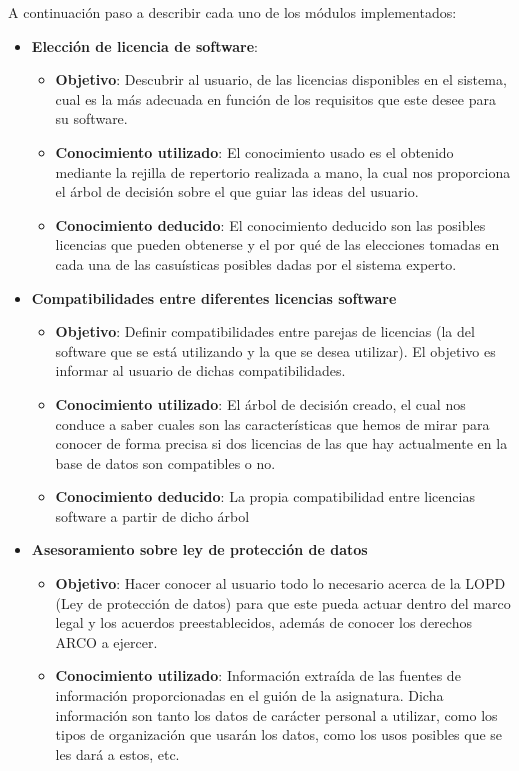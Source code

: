 A continuación paso a describir cada uno de los módulos implementados:
\begin{itemize}
	\item \textbf{Elección de licencia de software}:\\
		\begin{itemize}
			\item \textbf{Objetivo}: Descubrir al usuario, de las licencias disponibles en el sistema, cual es la más adecuada en función de los requisitos que este desee para su software.
			\item \textbf{Conocimiento utilizado}: El conocimiento usado es el obtenido mediante la rejilla de repertorio realizada a mano, la cual nos proporciona el árbol de decisión sobre el que guiar las ideas del usuario.
			\item \textbf{Conocimiento deducido}: El conocimiento deducido son las posibles licencias que pueden obtenerse y el por qué de las elecciones tomadas en cada una de las casuísticas posibles dadas por el sistema experto.
		\end{itemize}
	\item \textbf{Compatibilidades entre diferentes licencias software}\\
		\begin{itemize}
			\item \textbf{Objetivo}: Definir compatibilidades entre parejas de licencias (la del software que se está utilizando y la que se desea utilizar). El objetivo es informar al usuario de dichas compatibilidades.
			\item \textbf{Conocimiento utilizado}: El árbol de decisión creado, el cual nos conduce a saber cuales son las características que hemos de mirar para conocer de forma precisa si dos licencias de las que hay actualmente en la base de datos son compatibles o no.
			\item \textbf{Conocimiento deducido}: La propia compatibilidad entre licencias software a partir de dicho árbol
		\end{itemize}
	\item \textbf{Asesoramiento sobre ley de protección de datos}	\\
		\begin{itemize}
			\item \textbf{Objetivo}: Hacer conocer al usuario todo lo necesario acerca de la LOPD (Ley de protección de datos) para que este pueda actuar dentro del marco legal y los acuerdos preestablecidos, además de conocer los derechos ARCO a ejercer.
			\item \textbf{Conocimiento utilizado}: Información extraída de las fuentes de información proporcionadas en el guión de la asignatura. Dicha información son tanto los datos de carácter personal a utilizar, como los tipos de organización que usarán los datos, como los usos posibles que se les dará a estos, etc.

\end{itemize}
\end{itemize}
